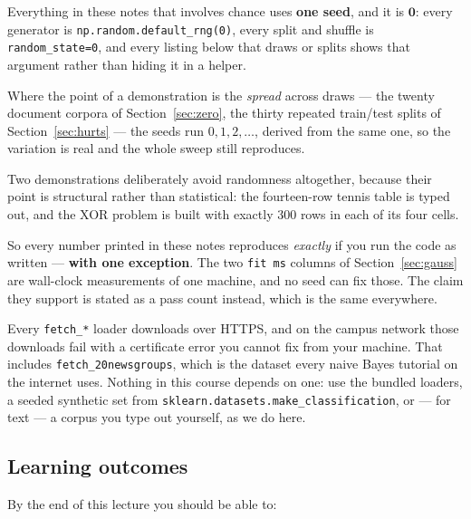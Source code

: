 \documentclass[11pt]{article}
\begin{document}
\begin{keyidea}
Everything in these notes that involves chance uses \textbf{one seed}, and it
is $\mathbf{0}$: every generator is \texttt{np.random.default\_rng(0)},
every split and shuffle is \texttt{random\_state=0}, and every listing below
that draws or splits shows that argument rather than hiding it in a helper.

Where the point of a demonstration is the \emph{spread} across draws --- the
twenty document corpora of Section~\ref{sec:zero}, the thirty repeated
train/test splits of Section~\ref{sec:hurts} --- the seeds run
$0, 1, 2, \dots$, derived from the same one, so the variation is real and the
whole sweep still reproduces.

Two demonstrations deliberately avoid randomness altogether, because their
point is structural rather than statistical: the fourteen-row tennis table is
typed out, and the XOR problem is built with exactly $300$ rows in each of its
four cells.

So every number printed in these notes reproduces \emph{exactly} if you run
the code as written --- \textbf{with one exception}. The two \texttt{fit ms}
columns of Section~\ref{sec:gauss} are wall-clock measurements of one
machine, and no seed can fix those. The claim they support is stated as a pass
count instead, which is the same everywhere.
\end{keyidea}

\begin{caution}
Every \texttt{fetch\_*} loader downloads over HTTPS, and on the campus network
those downloads fail with a certificate error you cannot fix from your machine.
That includes \texttt{fetch\_20newsgroups}, which is the dataset every naive
Bayes tutorial on the internet uses. Nothing in this course depends on one:
use the bundled loaders, a seeded synthetic set from
\texttt{sklearn.datasets.make\_classification}, or --- for text --- a corpus
you type out yourself, as we do here.
\end{caution}

\subsection{Learning outcomes}

By the end of this lecture you should be able to:
\end{document}
